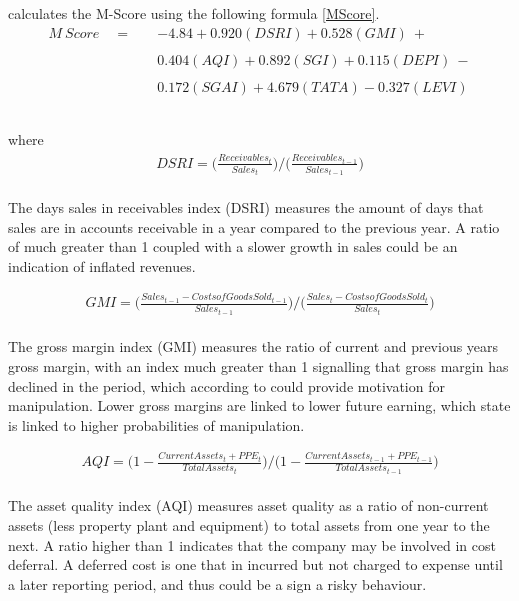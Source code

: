 {\cite{beneishOG} calculates the M-Score using the following formula \ref{MScore}.
\begin {equation}\label{MScore}
\begin{aligned}
M \ Score \quad =  \quad & -4.84 + 0.920(DSRI) + 0.528(GMI) \ + \\\\ 
		& 0.404(AQI)+ 0.892(SGI) + 0.115(DEPI) \ - \\\\
		& 0.172(SGAI) + 4.679(TATA) - 0.327(LEVI)  \ \\\\
\end{aligned}
\end{equation}\\
where
\begin {equation}\label{MScore-DSRI}
\begin{aligned}
DSRI = \bigg( \frac{Receivables_t}{Sales_t} \bigg) / \bigg( \frac{Receivables_{t-1}}{Sales_{t-1}} \bigg) 
\end{aligned}
\end{equation}\\
The days sales in receivables index (DSRI) measures the amount of days that sales are in accounts receivable in a year compared to the previous year. A ratio of much greater than 1 coupled with a slower growth in sales could be an indication of inflated revenues. 

\begin{equation}\label{MScore-GMI}
\begin{aligned}
GMI = \bigg( \frac{Sales_{t-1} - Costs of Goods Sold_{t-1}}{Sales_{t-1}} \bigg) / \bigg( \frac{Sales_{t} - Costs of Goods Sold_{t}}{Sales_{t}} \bigg)
\end{aligned}
\end{equation}\\
The gross margin index (GMI) measures the ratio of current and previous years gross margin, with an index much greater than 1 signalling that gross margin has declined in the period, which according to \cite{mahamaCorpFraud} could provide motivation for manipulation. Lower gross margins are linked to lower future earning, which \cite{beneishCost} state is linked to higher probabilities of manipulation.     

\begin{equation}\label{MScore-AQI}
\begin{aligned}
AQI = \bigg( 1 - \frac{Current Assets_t + PPE_t}{Total Assets_t} \bigg) /  \bigg( 1 - \frac{Current Assets_{t-1} + PPE_{t-1}}{Total Assets_{t-1}} \bigg)
\end{aligned}
\end{equation}\\
The asset quality index (AQI) measures asset quality as a ratio of non-current assets (less property plant and equipment) to total assets from one year to the next. A ratio higher than 1 indicates that the company may be involved in cost deferral. A deferred cost is one that in incurred but not charged to expense until a later reporting period, and thus could be a sign a risky behaviour.   

}
